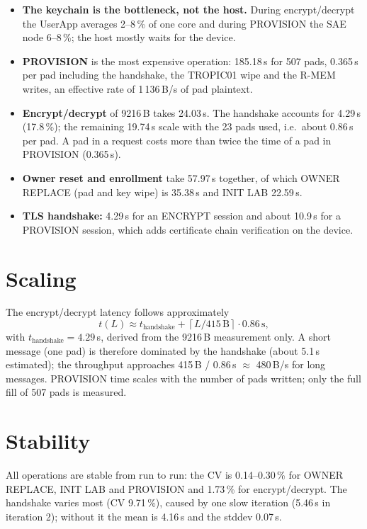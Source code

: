 \documentclass[11pt,a4paper]{report}
\begin{document}
\begin{itemize}
\item \textbf{The keychain is the bottleneck, not the host.} During encrypt/decrypt the UserApp averages 2--8\,\% of one core and during PROVISION the SAE node 6--8\,\%; the host mostly waits for the device.
\item \textbf{PROVISION} is the most expensive operation: 185.18\,s for 507 pads, 0.365\,s per pad including the handshake, the TROPIC01 wipe and the R-MEM writes, an effective rate of 1\,136\,B/s of pad plaintext.
\item \textbf{Encrypt/decrypt} of 9216\,B takes 24.03\,s. The handshake accounts for 4.29\,s (17.8\,\%); the remaining 19.74\,s scale with the 23 pads used, i.e.\ about 0.86\,s per pad. A pad in a request costs more than twice the time of a pad in PROVISION (0.365\,s).
\item \textbf{Owner reset and enrollment} take 57.97\,s together, of which OWNER REPLACE (pad and key wipe) is 35.38\,s and INIT LAB 22.59\,s.
\item \textbf{TLS handshake:} 4.29\,s for an ENCRYPT session and about 10.9\,s for a PROVISION session, which adds certificate chain verification on the device.
\end{itemize}

\section{Scaling}

The encrypt/decrypt latency follows approximately
\[
t(L) \approx t_\text{handshake} + \left\lceil L / 415\,\text{B} \right\rceil \cdot 0.86\,\text{s},
\]
with $t_\text{handshake} = 4.29$\,s, derived from the 9216\,B measurement only. A short message (one pad) is therefore dominated by the handshake (about 5.1\,s estimated); the throughput approaches 415\,B / 0.86\,s $\approx$ 480\,B/s for long messages. PROVISION time scales with the number of pads written; only the full fill of 507 pads is measured.

\section{Stability}

All operations are stable from run to run: the CV is 0.14--0.30\,\% for OWNER REPLACE, INIT LAB and PROVISION and 1.73\,\% for encrypt/decrypt. The handshake varies most (CV 9.71\,\%), caused by one slow iteration (5.46\,s in iteration 2); without it the mean is 4.16\,s and the stddev 0.07\,s.
\end{document}
